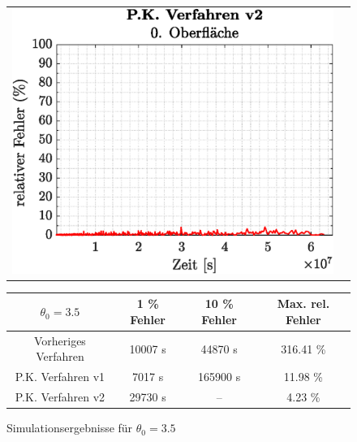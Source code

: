 \documentclass{listhesis}
\begin{document}
\begin{figure}[!h]
\begin{tabular}{@{}cc@{}}
\includegraphics[width=\wss\textwidth]{./include/figure_3.5/PC_new/CovFacetError0.eps}
\end{tabular}
\newline
\vspace*{0.5cm}
\newline
\begin{tabular}{|c|c|c|c|}
\hline
$\theta_0 = 3.5$ & 1 \% Fehler & 10 \% Fehler & Max. rel. Fehler\\
\hline
Vorheriges Verfahren & 10007 s & 44870 s & 316.41 \% \\
P.K. Verfahren v1 & 7017 s & 165900 s & 11.98 \% \\
P.K. Verfahren v2 & 29730 s & -- & 4.23 \% \\
\hline
\end{tabular}
\caption{Simulationsergebnisse für $\theta_0 = 3.5$}
\label{fig:figure_3.5}
\end{figure}

\end{document}

